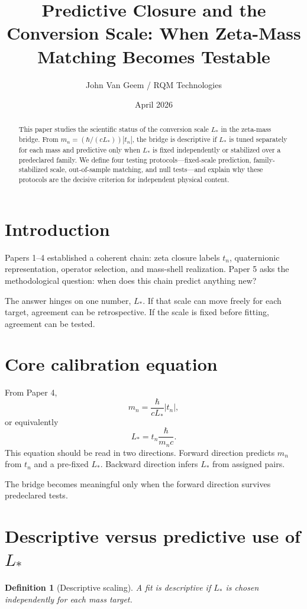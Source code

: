 \documentclass[11pt]{article}
\title{Predictive Closure and the Conversion Scale: When Zeta-Mass Matching Becomes Testable}
\author{John Van Geem / RQM Technologies}
\date{April 2026}
\newtheorem{definition}{Definition}
\begin{document}
\maketitle

\begin{abstract}
This paper studies the scientific status of the conversion scale $L_*$ in the zeta-mass bridge. From $m_n=(\hbar/(cL_*))|t_n|$, the bridge is descriptive if $L_*$ is tuned separately for each mass and predictive only when $L_*$ is fixed independently or stabilized over a predeclared family. We define four testing protocols---fixed-scale prediction, family-stabilized scale, out-of-sample matching, and null tests---and explain why these protocols are the decisive criterion for independent physical content.
\end{abstract}

\section{Introduction}
Papers 1--4 established a coherent chain: zeta closure labels $t_n$, quaternionic representation, operator selection, and mass-shell realization. Paper 5 asks the methodological question: when does this chain predict anything new?

The answer hinges on one number, $L_*$. If that scale can move freely for each target, agreement can be retrospective. If the scale is fixed before fitting, agreement can be tested.

\section{Core calibration equation}
From Paper 4,
\[
m_n=\frac{\hbar}{cL_*}|t_n|,
\]
or equivalently
\[
L_*=t_n\frac{\hbar}{m_nc}.
\]
This equation should be read in two directions. Forward direction predicts $m_n$ from $t_n$ and a pre-fixed $L_*$. Backward direction infers $L_*$ from assigned pairs.

The bridge becomes meaningful only when the forward direction survives predeclared tests.

\section{Descriptive versus predictive use of $L_*$}
\begin{definition}[Descriptive scaling]
A fit is descriptive if $L_*$ is chosen independently for each mass target.
\end{definition}
\end{document}
